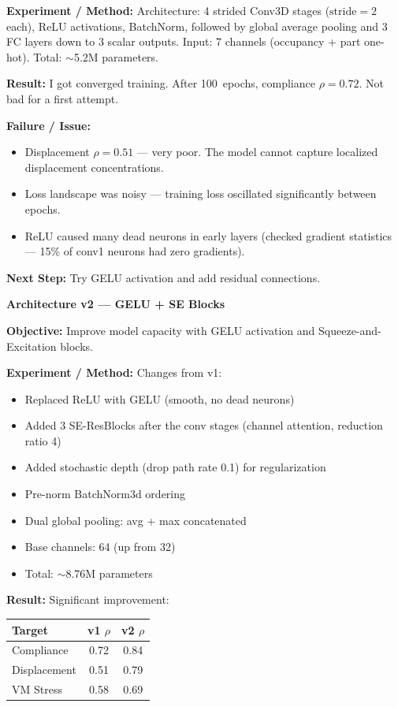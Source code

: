 \documentclass[11pt, letterpaper]{article}
\newcounter{entrynum}
\newcommand{\entry}[2]{%
  \refstepcounter{entrynum}%
  \vspace{6mm}%
  \noindent\begin{tcolorbox}[
    colback=bglight, colframe=entryblue,
    boxrule=1pt, arc=3pt,
    title={\textbf{Entry \theentrynum}\hfill\textbf{#1}},
    fonttitle=\large\color{white},
    colbacktitle=entryblue,
    left=3mm, right=3mm, top=2mm, bottom=2mm
  ]
  {\large\bfseries\color{entryblue} #2}
  \end{tcolorbox}
  \vspace{-1mm}%
}
\newcommand{\objective}{\par\textbf{\color{entryblue}Objective:} }
\newcommand{\experiment}{\par\textbf{\color{entryblue}Experiment / Method:} }
\newcommand{\result}{\par\textbf{\color{entryblue}Result:} }
\newcommand{\failure}{\par\textbf{\color{failred}Failure / Issue:} }
\newcommand{\nextstep}{\par\textbf{\color{notegray}Next Step:} }
\begin{document}
\experiment
Architecture: 4 strided Conv3D stages ($\text{stride}=2$ each), ReLU
activations, BatchNorm, followed by global average pooling and 3 FC layers
down to 3 scalar outputs. Input: 7 channels (occupancy + part one-hot).
Total: $\sim$5.2M parameters.

\result
I got converged training. After 100~epochs, compliance $\rho = 0.72$. Not bad for a first attempt.

\failure
\begin{itemize}[nosep]
  \item Displacement $\rho = 0.51$ --- very poor. The model cannot capture
    localized displacement concentrations.
  \item Loss landscape was noisy --- training loss oscillated significantly
    between epochs.
  \item ReLU caused many dead neurons in early layers (checked gradient
    statistics --- 15\% of conv1 neurons had zero gradients).
\end{itemize}

\nextstep
Try GELU activation and add residual connections.

\entry{February 14, 2026}{Architecture v2 --- GELU + SE Blocks}

\objective
Improve model capacity with GELU activation and Squeeze-and-Excitation blocks.

\experiment
Changes from v1:
\begin{itemize}[nosep]
  \item Replaced ReLU with GELU (smooth, no dead neurons)
  \item Added 3 SE-ResBlocks after the conv stages (channel attention,
    reduction ratio 4)
  \item Added stochastic depth (drop path rate 0.1) for regularization
  \item Pre-norm BatchNorm3d ordering
  \item Dual global pooling: avg + max concatenated
  \item Base channels: 64 (up from 32)
  \item Total: $\sim$8.76M parameters
\end{itemize}

\result
Significant improvement:
\begin{center}
\begin{tabular}{lcc}
  \toprule
  \textbf{Target} & \textbf{v1 $\rho$} & \textbf{v2 $\rho$} \\
  \midrule
  Compliance & 0.72 & 0.84 \\
  Displacement & 0.51 & 0.79 \\
  VM Stress & 0.58 & 0.69 \\
  \bottomrule
\end{tabular}
\end{center}
\end{document}
